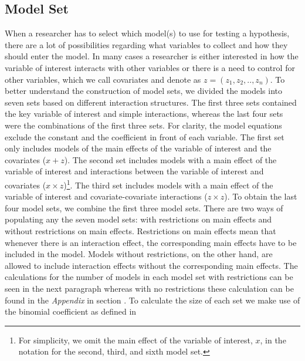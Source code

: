 \subsection{Model Set}
When a researcher has to select which model(s) to use for testing a hypothesis, there are a lot of possibilities regarding what variables to collect and how they should enter the model. In many cases a researcher is either interested in how the variable of interest interacts with other variables or there is a need to control for other variables, which we call covariates and denote as $z=(z_1,z_2,..,z_n)$. 
To better understand the construction of model sets, we divided the models into seven sets based on different interaction structures. The first three sets contained the key variable of interest and simple interactions, whereas the last four sets were the combinations of the first three sets. For clarity, the model equations exclude the constant and the coefficient in front of each variable. The first set only includes models of the main effects of the variable of interest and the covariates ($x + z$). The second set includes models with a main effect of the variable of interest and interactions between the variable of interest and covariates ($x \times z$)\footnote{For simplicity, we omit the main effect of the variable of interest, $x$, in the notation for the second, third, and sixth model set.}. The third set includes models with a main effect of the variable of interest and covariate-covariate interactions ($z \times z$).
To obtain the last four model sets, we combine the first three model sets. There are two ways of populating any the seven model sets: with restrictions on main effects and without restrictions on main effects. Restrictions on main effects mean that whenever there is an interaction effect, the corresponding main effects have to be included in the model. Models without restrictions, on the other hand, are allowed to include interaction effects without the corresponding main effects. The calculations for the number of models in each model set with restrictions can be seen in the next paragraph whereas with no restrictions these calculation can be found in the \textit{Appendix} in section . To calculate the size of each set we make use of the binomial coefficient as defined in \\

